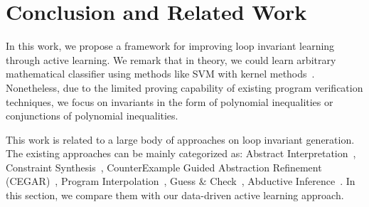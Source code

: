 
\section{Conclusion and Related Work} %
\label{sec:related}
In this work, we propose a framework for improving loop invariant learning through active learning. We remark that in theory, we could learn arbitrary mathematical classifier using methods like SVM with kernel methods~\cite{yu2009evolving}. Nonetheless, due to the limited proving capability of existing program verification techniques, we focus on invariants in the form of polynomial inequalities or conjunctions of polynomial inequalities.


This work is related to a large body of approaches on loop invariant generation. 
The existing approaches can be mainly categorized as:
Abstract Interpretation~\cite{cousot1978automatic,mine2006octagon,cousot1979systematic,karr1976affine,vincent2009subpolyhedra},
Constraint Synthesis~\cite{ashutosh2009invgen,michael2003linear,sumit2009constraint},
CounterExample Guided Abstraction Refinement (CEGAR)~\cite{henzinger2003software,thomas2001slam,edmund2003counterexample},
Program Interpolation~\cite{kenneth2010lazy,thomas2004abstractions,kenneth2003interpolation,Kenneth2006lazy},
Guess \& Check~\cite{cormac2001houdini,ernst2007daikon},
Abductive Inference~\cite{isil2013inductive}.
In this section, we compare them with our data-driven active learning approach.

